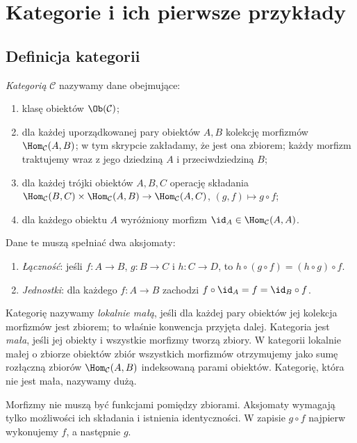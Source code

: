 \providecommand{\atlasref}[2]{#2}
\section{Kategorie i ich pierwsze przykłady}\label{sec:kategorie}

\subsection{Definicja kategorii}

\begin{definicja}[Kategoria]\label{def:kategoria}
\emph{Kategorią} $\mathcal C$ nazywamy dane obejmujące:
\begin{enumerate}
\item klasę obiektów $\Ob(\mathcal C)$;
\item dla każdej uporządkowanej pary obiektów $A,B$ kolekcję morfizmów $\Hom_{\mathcal C}(A,B)$; w tym skrypcie zakładamy, że jest ona zbiorem; każdy morfizm traktujemy wraz z jego dziedziną $A$ i przeciwdziedziną $B$;
\item dla każdej trójki obiektów $A,B,C$ operację składania
$\Hom_{\mathcal C}(B,C)\times\Hom_{\mathcal C}(A,B)\to\Hom_{\mathcal C}(A,C)$, $(g,f)\mapsto g\circ f$;
\item dla każdego obiektu $A$ wyróżniony morfizm $\id_A\in\Hom_{\mathcal C}(A,A)$.
\end{enumerate}
Dane te muszą spełniać dwa aksjomaty:
\begin{enumerate}[label=(\roman*)]
\item \emph{Łączność}: jeśli $f:A\to B$, $g:B\to C$ i $h:C\to D$, to $h\circ(g\circ f)=(h\circ g)\circ f$.
\item \emph{Jednostki}: dla każdego $f:A\to B$ zachodzi $f\circ\id_A=f=\id_B\circ f$.
\end{enumerate}
Kategorię nazywamy \emph{lokalnie małą}, jeśli dla każdej pary obiektów jej kolekcja morfizmów jest zbiorem; to właśnie konwencja przyjęta dalej. Kategoria jest \emph{mała}, jeśli jej obiekty i wszystkie morfizmy tworzą zbiory. W kategorii lokalnie małej o zbiorze obiektów zbiór wszystkich morfizmów otrzymujemy jako sumę rozłączną zbiorów $\Hom_{\mathcal C}(A,B)$ indeksowaną parami obiektów. Kategorię, która nie jest mała, nazywamy dużą.
\end{definicja}

Morfizmy nie muszą być funkcjami pomiędzy zbiorami. Aksjomaty wymagają tylko możliwości ich składania i istnienia identyczności. W zapisie $g\circ f$ najpierw wykonujemy $f$, a następnie $g$.

